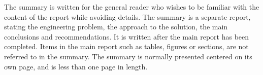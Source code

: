 \begin{Summary}
The summary is written for the general reader who wishes to be familiar with the content of the report while avoiding details. The summary is a separate report, stating the engineering problem, the approach to the solution, the main conclusions and recommendations. It is written after the main report has been completed. Items in the main report such as tables, figures or sections, are not referred to in the summary. The summary is normally presented centered on its own page, and is less than one page in length.
\end{Summary}